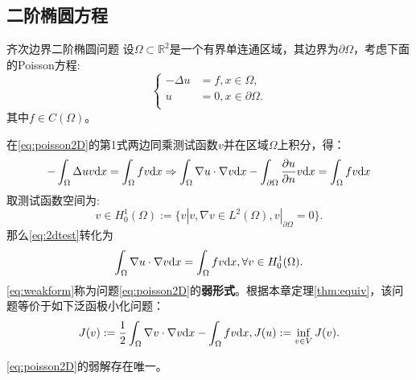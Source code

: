 \subsection{二阶椭圆方程}
\begin{definition}{齐次边界二阶椭圆问题}
  设$\Omega\subset\mathbb{R}^{2}$是一个有界单连通区域，其边界为$\partial\Omega$，考虑下面的Poisson方程:
  \begin{equation}
    \label{eq:poisson2D}
    \left\{
      \begin{aligned}
        -\Delta u&=f,x\in\Omega,\\
        u&=0,x\in\partial\Omega.\\
      \end{aligned}
    \right.
  \end{equation}
  其中$f\in C(\Omega)$。
\end{definition}
在\eqref{eq:poisson2D}的第1式两边同乘测试函数$v$并在区域$\Omega$上积分，得：
\begin{equation}
  \label{eq:2dtest}
  \begin{aligned}
    -\int_{\Omega}\Delta uv\mathrm{d} x=\int_{\Omega}fv\mathrm{d} x\Rightarrow
    \int_{\Omega}\nabla u\cdot\nabla v\mathrm{d} x-\int_{\partial\Omega}\frac{\partial u}{\partial n}v\mathrm{d} x=\int_{\Omega}fv\mathrm{d} x
  \end{aligned}
\end{equation}
取测试函数空间为:
\begin{equation}
  v\in H_{0}^{1}(\Omega):=\{v|v,\nabla v\in L^{2}(\Omega),v|_{\partial\Omega}=0\}.
\end{equation}
那么\eqref{eq:2dtest}转化为
\begin{equation}
  \label{eq:weakform}
  \int_{\Omega}\nabla u\cdot\nabla v\mathrm{d} x=\int_{\Omega}fv\mathrm{d} x,\forall v\in H_{0}^{1}(\Omega).
\end{equation}
\eqref{eq:weakform}称为问题\eqref{eq:poisson2D}的\textbf{弱形式}。根据本章定理\ref{thm:equiv}，该问题等价于如下泛函极小化问题：
\begin{equation}
  J(v):=\frac{1}{2}\int_{\Omega}\nabla v\cdot\nabla v\mathrm{d} x-\int_{\Omega}fv\mathrm{d} x,J(u):=\inf_{v\in V}J(v).
\end{equation}
\begin{theorem}
  \eqref{eq:poisson2D}的弱解存在唯一。
\end{theorem}
